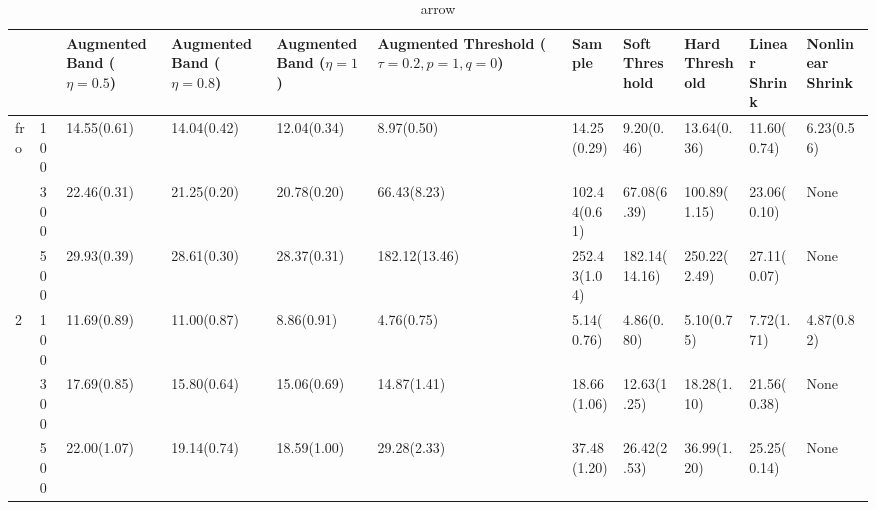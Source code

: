 \begin{table}[htbp]
\centering
\caption{arrow}
\label{my label}
\begin{tabular}{ll|p{2cm}p{2cm}p{2cm}p{2cm}p{2cm}p{2cm}p{2cm}p{2cm}p{2cm}}
\toprule
  &     & Augmented Band ($\eta=0.5$) & Augmented Band ($\eta=0.8$) & Augmented Band ($\eta=1$) & Augmented Threshold ($\tau=0.2, p=1, q=0$) &        Sample & Soft Threshold & Hard Threshold & Linear Shrink & Nonlinear Shrink \\
\midrule
fro & 100 &                 14.55(0.61) &                 14.04(0.42) &               12.04(0.34) &                                 8.97(0.50) &   14.25(0.29) &     9.20(0.46) &    13.64(0.36) &   11.60(0.74) &       6.23(0.56) \\
  & 300 &                 22.46(0.31) &                 21.25(0.20) &               20.78(0.20) &                                66.43(8.23) &  102.44(0.61) &    67.08(6.39) &   100.89(1.15) &   23.06(0.10) &             None \\
  & 500 &                 29.93(0.39) &                 28.61(0.30) &               28.37(0.31) &                              182.12(13.46) &  252.43(1.04) &  182.14(14.16) &   250.22(2.49) &   27.11(0.07) &             None \\
2 & 100 &                 11.69(0.89) &                 11.00(0.87) &                8.86(0.91) &                                 4.76(0.75) &    5.14(0.76) &     4.86(0.80) &     5.10(0.75) &    7.72(1.71) &       4.87(0.82) \\
  & 300 &                 17.69(0.85) &                 15.80(0.64) &               15.06(0.69) &                                14.87(1.41) &   18.66(1.06) &    12.63(1.25) &    18.28(1.10) &   21.56(0.38) &             None \\
  & 500 &                 22.00(1.07) &                 19.14(0.74) &               18.59(1.00) &                                29.28(2.33) &   37.48(1.20) &    26.42(2.53) &    36.99(1.20) &   25.25(0.14) &             None \\
\bottomrule
\end{tabular}
\end{table}

